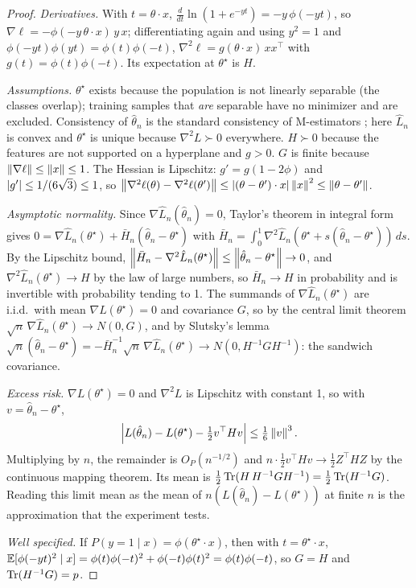 \begin{proof}
\emph{Derivatives.} With $t=\theta\cdot x$, $\frac{d}{dt}\ln(1+e^{-yt})=-y\,\phi(-yt)$, so
$\nabla\ell=-\phi(-y\,\theta\cdot x)\,y\,x$; differentiating again and using $y^2=1$ and
$\phi(-yt)\phi(yt)=\phi(t)\phi(-t)$, $\nabla^2\ell=g(\theta\cdot x)\,xx^\top$ with $g(t)=\phi(t)\phi(-t)$.
Its expectation at $\theta^\star$ is $H$.

\emph{Assumptions.} $\theta^\star$ exists because the population is not linearly separable (the
classes overlap); training samples that \emph{are} separable have no minimizer and are excluded.
Consistency of $\hat\theta_n$ is the standard consistency of M-estimators \citep{vandervaart1998asymptotic}; here
$\hat L_n$ is convex and $\theta^\star$ is unique because $\nabla^2L\succ0$ everywhere.
$H\succ0$ because the features are not supported on a hyperplane and $g>0$. $G$ is finite because
$\left\lVert \nabla\ell \right\rVert\le\left\lVert x \right\rVert\le1$. The Hessian is Lipschitz: $g'=g(1-2\phi)$ and $\left\lvert g' \right\rvert\le1/(6\sqrt3)\le1$,
so $\left\lVert \nabla^2\ell(\theta)-\nabla^2\ell(\theta') \right\rVert\le\left\lvert (\theta-\theta')\cdot x \right\rvert\left\lVert x \right\rVert^2\le\left\lVert \theta-\theta' \right\rVert$.

\emph{Asymptotic normality.} Since $\nabla\hat L_n(\hat\theta_n)=0$, Taylor's theorem in integral
form gives $0=\nabla\hat L_n(\theta^\star)+\bar H_n(\hat\theta_n-\theta^\star)$ with
$\bar H_n=\int_0^1\nabla^2\hat L_n(\theta^\star+s(\hat\theta_n-\theta^\star))\,ds$. By the Lipschitz
bound, $\left\lVert \bar H_n-\nabla^2\hat L_n(\theta^\star) \right\rVert\le\left\lVert \hat\theta_n-\theta^\star \right\rVert\to0$, and
$\nabla^2\hat L_n(\theta^\star)\to H$ by the law of large numbers, so $\bar H_n\to H$ in probability
and is invertible with probability tending to 1. The summands of $\nabla\hat L_n(\theta^\star)$
are i.i.d.\ with mean $\nabla L(\theta^\star)=0$ and covariance $G$, so by the central limit
theorem $\sqrt n\,\nabla\hat L_n(\theta^\star)\to N(0,G)$, and by Slutsky's lemma
$\sqrt n(\hat\theta_n-\theta^\star)=-\bar H_n^{-1}\sqrt n\,\nabla\hat L_n(\theta^\star)\to N(0,H^{-1}GH^{-1})$:
the sandwich covariance.

\emph{Excess risk.} $\nabla L(\theta^\star)=0$ and $\nabla^2L$ is Lipschitz with constant 1, so
with $v=\hat\theta_n-\theta^\star$,
\[ \left\lvert L(\hat\theta_n)-L(\theta^\star)-\tfrac12v^\top Hv \right\rvert\le\tfrac16\left\lVert v \right\rVert^3. \]
Multiplying by $n$, the remainder is $O_P(n^{-1/2})$ and $n\cdot\frac12v^\top Hv\to\frac12Z^\top HZ$ by
the continuous mapping theorem. Its mean is $\frac12\operatorname{Tr}(H\,H^{-1}GH^{-1})=\frac12\operatorname{Tr}(H^{-1}G)$.
Reading this limit mean as the mean of $n(L(\hat\theta_n)-L(\theta^\star))$ at finite $n$ is the
approximation that the experiment tests.

\emph{Well specified.} If $P(y=1\mid x)=\phi(\theta^\star\cdot x)$, then with $t=\theta^\star\cdot x$,
$\mathbb{E}[\phi(-yt)^2\mid x]=\phi(t)\phi(-t)^2+\phi(-t)\phi(t)^2=\phi(t)\phi(-t)$, so $G=H$ and
$\operatorname{Tr}(H^{-1}G)=p$.
\end{proof}

